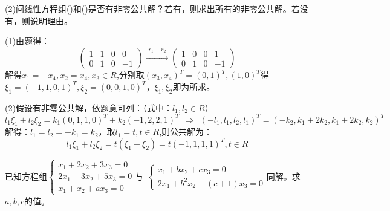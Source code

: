 \documentclass[a4paper]{report}
\begin{document}
(2)问线性方程组(\uppercase\expandafter{})和(\uppercase\expandafter{})是否有非零公共解？若有，则求出所有的非零公共解。若没有，则说明理由。

\begin{jie}
(1)由题得：
\begin{equation*}
\begin{pmatrix}
1&1&0&0\\
0&1&0&-1
\end{pmatrix}
\xrightarrow{\substack{r_1-r_2}}
{
\begin{pmatrix}
1&0&0&1\\
0&1&0&-1
\end{pmatrix}
}
\end{equation*}
解得$x_1=-x_4,x_2=x_4,x_3\in R$,分别取$(x_3,x_4)^T=(0,1)^T,(1,0)^T$得$\xi_1=(-1,1,0,1)^T,\xi_2=(0,0,1,0)^T$，$\xi_1,\xi_2$即为所求。

(2)假设有非零公共解，依题意可列：（式中：$l_1,l_2\in R$）
\begin{equation*}
l_1\xi_1+l_2\xi_2=k_1(0,1,1,0)^T + k_2(-1,2,2,1)^T~~\Rightarrow~~(-l_1,l_1,l_2,l_1)^T=(-k_2,k_1+2k_2,k_1+2k_2,k_2)^T
\end{equation*}
解得：$l_1=l_2=-k_1=k_2$，取$l_1=t,t\in R$,则公共解为：
\begin{equation*}
l_1\xi_1+l_2\xi_2=t(\xi_1+\xi_2)=t(-1,1,1,1)^T,t\in R
\end{equation*}
\end{jie}

\EX 已知方程组$
\begin{cases}
x_1+2x_2+3x_3=0\\
2x_1+3x_2+5x_3=0\\
x_1+x_2+ax_3=0
\end{cases}
$与
$
\begin{cases}
x_1+bx_2+cx_3=0\\
2x_1+b^2x_2+(c+1)x_3=0
\end{cases}
$同解。求$a,b,c$的值。
\end{document}

